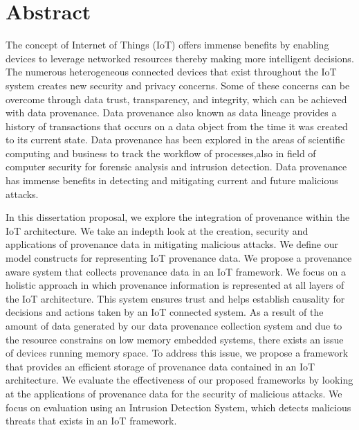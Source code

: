 

\chapter*{Abstract}
The concept of Internet of Things (IoT) offers immense benefits by
enabling devices to leverage networked resources thereby making more intelligent
decisions. The numerous heterogeneous connected devices that exist throughout
the IoT system creates new security and privacy concerns. Some of these concerns can
be overcome through data trust, transparency, and integrity, which can be
achieved with data provenance. Data provenance also known as data lineage provides a history of transactions that occurs on a data object from the time it was created to its current state. Data provenance has been explored in the areas of scientific computing and business to track the workflow of processes,also in field of computer security for forensic analysis and intrusion detection. Data provenance has immense benefits in detecting and mitigating current and future malicious attacks.  \par In this dissertation proposal, we explore the integration of provenance within the IoT architecture. We take an indepth look at the creation, security and applications of provenance data in mitigating malicious attacks. We define our model constructs for representing IoT provenance data. We propose a provenance aware system that collects provenance data in an IoT framework. We focus on a holistic approach in which provenance information is represented at all layers of the IoT architecture. This system ensures trust and helps establish causality for decisions and actions taken by an IoT connected system. As a result of the amount of data generated by our data provenance collection system and due to the resource constrains on low memory embedded systems, there exists an issue of devices running memory space. To address this issue, we propose a framework that provides an efficient storage of provenance data contained in an IoT architecture. We evaluate the effectiveness of our proposed frameworks by looking at the applications of provenance data for the security of malicious attacks. We focus on evaluation using an Intrusion Detection System, which detects malicious threats that exists in an IoT framework.


